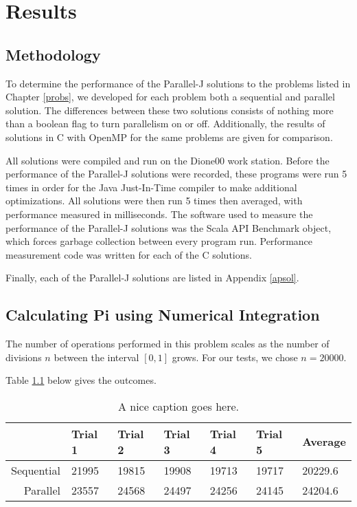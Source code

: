 \chapter{Results}
\label{res}

\section{Methodology}
To determine the performance of the Parallel-J solutions to the problems listed in Chapter \ref{probs}, 
we developed for each problem both a sequential and parallel solution. 
The differences between these two solutions consists of nothing more than a boolean flag 
to turn parallelism on or off. 
Additionally, the results of solutions in C with OpenMP for the same problems 
are given for comparison.

All solutions were compiled and run on the Dione00 work station. %
Before the performance of the Parallel-J solutions were recorded, 
these programs were run 5 times in order for the Java Just-In-Time compiler %
to make additional optimizations.
All solutions were then run 5 times then averaged, with performance measured in milliseconds.
The software used to measure the performance of the Parallel-J solutions was the Scala API Benchmark object, %
which forces garbage collection between every program run.
Performance measurement code was written for each of the C solutions.

Finally, each of the Parallel-J solutions are listed in Appendix \ref{apsol}. %

\section{Calculating Pi using Numerical Integration}
The number of operations performed in this problem scales 
as the number of divisions $n$ between the interval $[0,1]$ grows.
For our tests, we chose $n=20000$.

Table \ref{tnip} below gives the outcomes.

\begin{table}[htbp]
\begin{center}
\begin{tabular}{|r|l|l|l|l|l||l|}
	\hline
	           & Trial 1 & Trial 2 & Trial 3 & Trial 4 & Trial 5 & Average \\ 
	\hline
	\hline
	Sequential & 21995   & 19815   & 19908   & 19713   & 19717   & 20229.6 \\ 
	\hline
	Parallel   & 23557   & 24568   & 24497   & 24256   & 24145   & 24204.6 \\ 
	\hline
\end{tabular}
\end{center}
\caption{A nice caption goes here.}
\label{tnip}
\end{table}

